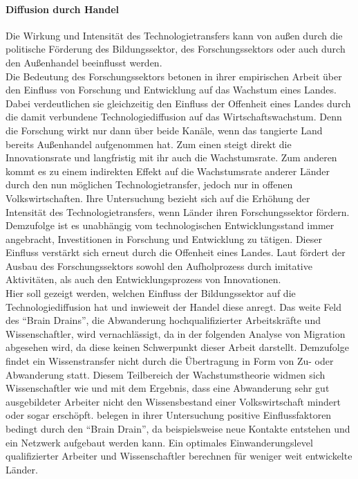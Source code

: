 \paragraph{Diffusion durch Handel}
Die Wirkung und Intensität des Technologietransfers kann von außen durch die politische Förderung des Bildungssektor, des Forschungssektors oder auch durch den Außenhandel beeinflusst werden.\\ Die Bedeutung des Forschungssektors betonen \cite{Griffith.2004} in ihrer empirischen Arbeit über den Einfluss von Forschung und Entwicklung auf das Wachstum eines Landes. Dabei verdeutlichen sie gleichzeitig den Einfluss der Offenheit eines Landes durch die damit verbundene Technologiediffusion auf das Wirtschaftswachstum. Denn die Forschung wirkt nur dann über beide Kanäle, wenn das tangierte Land bereits Außenhandel aufgenommen hat. Zum einen steigt direkt die Innovationsrate und langfristig mit ihr auch die Wachstumsrate. Zum anderen kommt es zu einem indirekten Effekt auf die Wachstumsrate anderer Länder durch den nun möglichen Technologietransfer, jedoch nur in offenen Volkswirtschaften. Ihre Untersuchung bezieht sich auf die Erhöhung der Intensität des Technologietransfers, wenn Länder ihren Forschungssektor fördern. Demzufolge ist es unabhängig vom technologischen Entwicklungsstand immer angebracht, Investitionen in Forschung und Entwicklung zu tätigen. Dieser Einfluss verstärkt sich erneut  durch die Offenheit eines Landes. Laut \cite{Griffith.2004}  fördert der Ausbau des Forschungssektors sowohl den Aufholprozess durch imitative Aktivitäten, als auch den Entwicklungsprozess von Innovationen.\\
%
Hier soll gezeigt werden, welchen Einfluss der Bildungssektor auf die Technologiediffusion hat und inwieweit der Handel diese anregt.
%
Das weite Feld des "`Brain Drains"', die Abwanderung hochqualifizierter Arbeitskräfte und Wissenschaftler, wird vernachlässigt, da in der folgenden Analyse von Migration abgesehen wird, da diese keinen Schwerpunkt dieser Arbeit darstellt. Demzufolge findet ein Wissenstransfer nicht durch die Übertragung in Form von Zu- oder Abwanderung statt. Diesem Teilbereich der Wachstumstheorie widmen sich  Wissenschaftler wie \cite{Agrawal.2011,Docquier.Sept} und \cite{ONeil.WashingtonDC} mit dem Ergebnis, dass eine Abwanderung sehr gut ausgebildeter Arbeiter nicht den Wissensbestand einer Volkswirtschaft mindert oder sogar erschöpft.  \cite{Docquier.Sept}  belegen in ihrer Untersuchung positive Einflussfaktoren bedingt durch den "`Brain Drain"', da beispielsweise neue Kontakte entstehen und ein Netzwerk aufgebaut werden kann. Ein optimales Einwanderungslevel qualifizierter Arbeiter und Wissenschaftler berechnen \cite{Docquier.Sept} für weniger weit entwickelte Länder.\\
